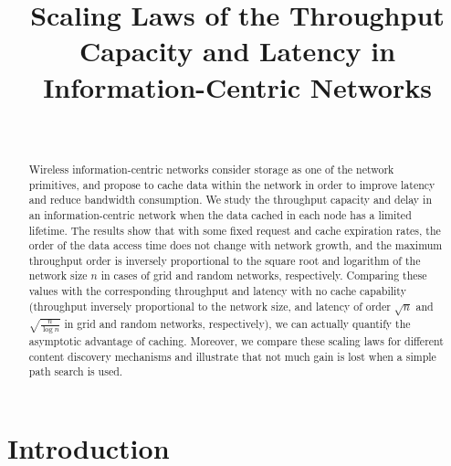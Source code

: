 \documentclass[journal]{IEEEtran}
\theoremstyle{plain}
\theoremstyle{remark}
\begin{document}
\title{Scaling Laws of the Throughput Capacity and Latency in Information-Centric Networks}

\author{\\
}


\maketitle

\begin{abstract}
Wireless information-centric networks consider storage as one of the network primitives, and propose to cache data within the network in order to improve latency and reduce bandwidth consumption. We study the throughput capacity and delay in an information-centric network when the data cached in each node has a limited lifetime. The results show that with some fixed request and cache expiration rates, the order of the data access time does not change with network growth, and the maximum throughput order is inversely proportional to the square root and logarithm of the network size $n$ in cases of grid and random networks, respectively. Comparing these values with the corresponding throughput and latency with no cache capability (throughput inversely proportional to the network size, and latency of order $\sqrt{n}$ and $\sqrt{\frac{n}{\log n}}$ in grid and random networks, respectively), we can actually quantify the asymptotic advantage of caching. Moreover, we compare these scaling laws for different content discovery mechanisms and illustrate that not much gain is lost when a simple path search is used. 
\end{abstract}

\IEEEpeerreviewmaketitle

\section{Introduction}
\end{document}
